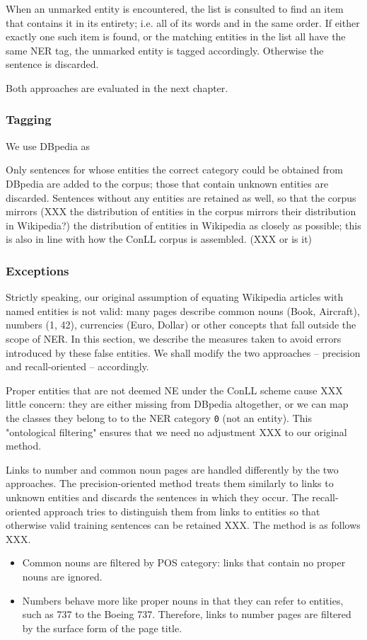 \documentclass[11pt]{article}
\begin{document}
When an unmarked entity is encountered, the list is consulted to find an item that contains it in its entirety; i.e. all of its words and in the same order. If either exactly one such item is found, or the matching entities in the list all have the same NER tag, the unmarked entity is tagged accordingly. Otherwise the sentence is discarded.

Both approaches are evaluated in the next chapter.

\subsubsection{Tagging}

We use DBpedia as 

Only sentences for whose entities the correct category could be obtained from DBpedia are added to the corpus; those that contain unknown entities are discarded. Sentences without any entities are retained as well, so that the corpus mirrors (XXX the distribution of entities in the corpus mirrors their distribution in Wikipedia?) the distribution of entities in Wikipedia as closely as possible; this is also in line with how the ConLL corpus is assembled. (XXX or is it)

\subsubsection{Exceptions}

Strictly speaking, our original assumption of equating Wikipedia articles with named entities is not valid: many pages describe common nouns (Book, Aircraft), numbers (1, 42), currencies (Euro, Dollar) or other concepts that fall outside the scope of NER. In this section, we describe the measures taken to avoid errors introduced by these false entities. We shall modify the two approaches -- precision and recall-oriented -- accordingly.

Proper entities that are not deemed NE under the ConLL scheme cause XXX little concern: they are either missing from DBpedia altogether, or we can map the classes they belong to to the NER category \texttt{0} (not an entity). This "ontological filtering" ensures that we need no adjustment XXX to our original method.

Links to number and common noun pages are handled differently by the two approaches. The precision-oriented method treats them similarly to links to unknown entities and discards the sentences in which they occur. The recall-oriented approach tries to distinguish them from links to entities so that otherwise valid training sentences can be retained XXX. The method is as follows XXX.
\begin{itemize}
\item Common nouns are filtered by POS category: links that contain no proper nouns are ignored.
\item Numbers behave more like proper nouns in that they can refer to entities, such as 737 to the Boeing 737. Therefore, links to number pages are filtered by the surface form of the page title.
\end{itemize}
\end{document}

